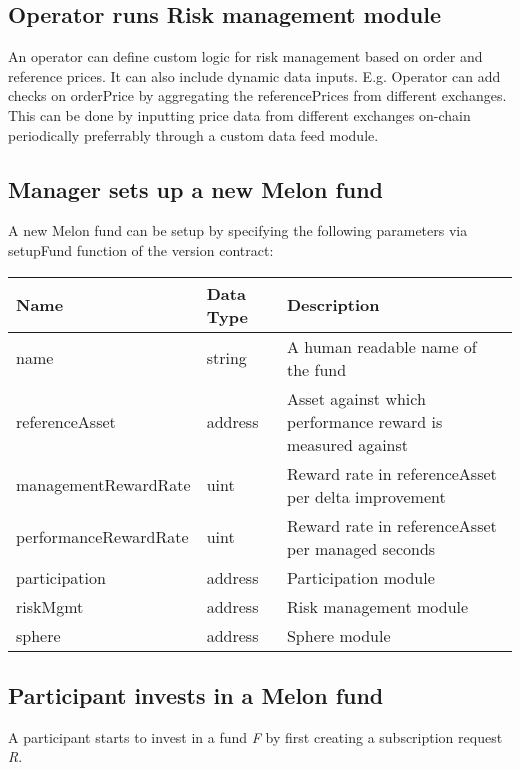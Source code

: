 \documentclass[conference]{IEEEtran}
\begin{document}
\subsection{Operator runs Risk management module}

An operator can define custom logic for risk management based on order and reference prices. It can also include dynamic data inputs. E.g. Operator can add checks on orderPrice by aggregating the referencePrices from different exchanges. This can be done by inputting price data from different exchanges on-chain periodically preferrably through a custom data feed module.

\subsection{Manager sets up a new Melon fund}	\label{interaction:setup-fund}

A new Melon fund can be setup by specifying the following parameters via setupFund function of the version contract:

\begin{center}
		\footnotesize
		\begin{tabular}{ | p{2.7cm} | p{0.8cm} | p{4cm} | }
		\hline
		Name & Data Type & Description \\ \hline
		name & string & A human readable name of the fund \\ \hline
		referenceAsset & address & Asset against which performance reward is measured against \\ \hline
		managementRewardRate & uint	& Reward rate in referenceAsset per delta improvement \\ \hline
		performanceRewardRate & uint & Reward rate in referenceAsset per managed seconds \\ \hline
		participation & address	& Participation module \\ \hline
		riskMgmt & address & Risk management module \\ \hline
		sphere & address & Sphere module \\ \hline
		\end{tabular}
\end{center}

\subsection{Participant invests in a Melon fund} \label{interaction:invest}

A participant starts to invest in a fund \textit{F} by first creating a subscription request \textit{R}.
\end{document}

